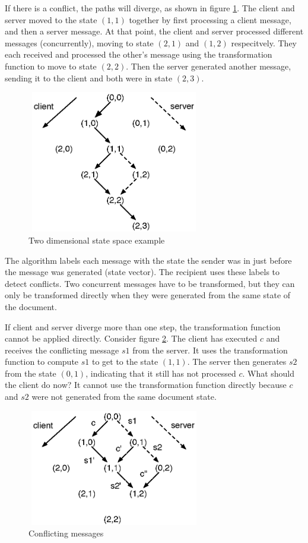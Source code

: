 If there is a conflict, the paths will diverge, as shown in figure \ref{jupiter:statespace1}. The client and server moved to the state $(1,1)$ together by first processing a client message, and then a server message. At that point, the client and server processed different messages (concurrently), moving to state $(2,1)$ and $(1,2)$ respecitvely. They each received and processed the other's message using the transformation function to move to state $(2,2)$. Then the server generated another message, sending it to the client and both were in state $(2,3)$.

\begin{figure}[H]
  \centering
  \includegraphics[width=3in,height=2.45in]{../../images/jupiter2.eps}
  \caption{Two dimensional state space example}
  \label{jupiter:statespace1}
\end{figure}

The algorithm labels each message with the state the sender was in just before the message was generated (state vector). The recipient uses these labels to detect conflicts. Two concurrent messages have to be transformed, but they can only be transformed directly when they were generated from the same state of the document. 

If client and server diverge more than one step, the transformation function cannot be applied directly. Consider figure \ref{jupiter:statespace2}. The client has executed $c$ and receives the conflicting message $s1$ from the server. It uses the transformation function to compute $s1$ to get to the state $(1,1)$. The server then generates $s2$ from the state $(0,1)$, indicating that it still has not processed $c$. What should the client do now? It cannot use the transformation function directly because $c$ and $s2$ were not generated from the same document state.

\begin{figure}[H]
 \centering
 \includegraphics[width=3in,height=2in]{../../images/jupiter.eps}
 \caption{Conflicting messages}
 \label{jupiter:statespace2}
\end{figure}

